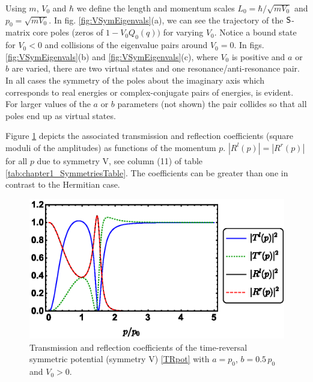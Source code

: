 Using $m$, $V_0$ and $\hbar$ we define the length and momentum scales $L_0 = \hbar/\sqrt{mV_0}$ and $p_0 = \sqrt{mV_0}$. In fig. \ref{fig:VSymEigenvals}(a), we can see the trajectory of the ${\sf S}$-matrix core poles (zeros
of $1-V_0Q_0(q))$ for varying $V_0$. Notice a bound state for $V_0<0$ and collisions of the eigenvalue pairs around $V_0 = 0$. In figs. \ref{fig:VSymEigenvals}(b) and \ref{fig:VSymEigenvals}(c), where $V_0$ is positive and $a$ or $b$ are varied,
there are two virtual states and one resonance/anti-resonance pair. In all cases the symmetry of the poles about the imaginary axis
which corresponds to real energies or complex-conjugate pairs of energies, is evident. For larger values of the $a$ or $b$ parameters
(not shown)
the pair collides so that all poles end up as virtual states.

Figure \ref{fig:VSymScattAmplitudes} depicts the associated transmission and reflection coefficients (square moduli of the amplitudes) as functions of the momentum $p$. $|R^l(p)|=|R^r(p)|$ for all $p$ due to symmetry V, see column (11) of table \ref{tab:chapter1_SymmetriesTable}. The coefficients can be greater than one in contrast to the Hermitian case.

\begin{figure}
\begin{center}
	\includegraphics[width=0.75\linewidth]{Figures/VSymScattAmplitudes.eps}
\end{center}
\caption{Transmission and reflection coefficients of the time-reversal symmetric potential (symmetry V) \eqref{TRpot} with $a=p_0$, $b= 0.5\, p_0$ and $V_0>0$.}
\label{fig:VSymScattAmplitudes}
\end{figure}

%
